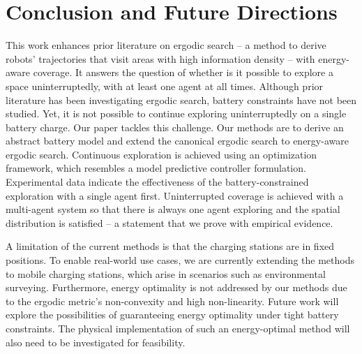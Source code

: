\documentclass[letterpaper,10pt,conference,twoside]{IEEEtran}
\theoremstyle{definition}
\begin{document}
\section{Conclusion and Future Directions}\label{sec:conc}
\noindent
This work enhances prior literature on ergodic search -- a method to derive robots' trajectories that visit areas with high information density -- with energy-aware coverage. It answers the question of whether is it possible to explore a space uninterruptedly, with at least one agent at all times. Although prior literature has been investigating ergodic search, battery constraints have not been studied. Yet, it is not possible to continue exploring uninterruptedly on a single battery charge. Our paper tackles this challenge. Our methods are to derive an abstract battery model and extend the canonical ergodic search to energy-aware ergodic search. Continuous exploration is achieved using an %
optimization framework, which resembles a model predictive controller formulation. Experimental data indicate the effectiveness of the battery-constrained exploration with a single agent first. Uninterrupted coverage is achieved with a multi-agent system so that there is always one agent exploring and the spatial distribution is satisfied -- a statement that we prove with empirical evidence.

A limitation of the current methods is that the charging stations are in fixed positions. To enable real-world use cases, we are currently extending the methods to mobile charging stations, which arise in scenarios such as environmental surveying. Furthermore, energy optimality is not addressed by our methods due to the ergodic metric's non-convexity and high non-linearity. Future work will explore the possibilities of guaranteeing energy optimality under tight battery constraints. The physical implementation of such an energy-optimal method will also need to be investigated for feasibility.

{\small
 

}
\end{document}
